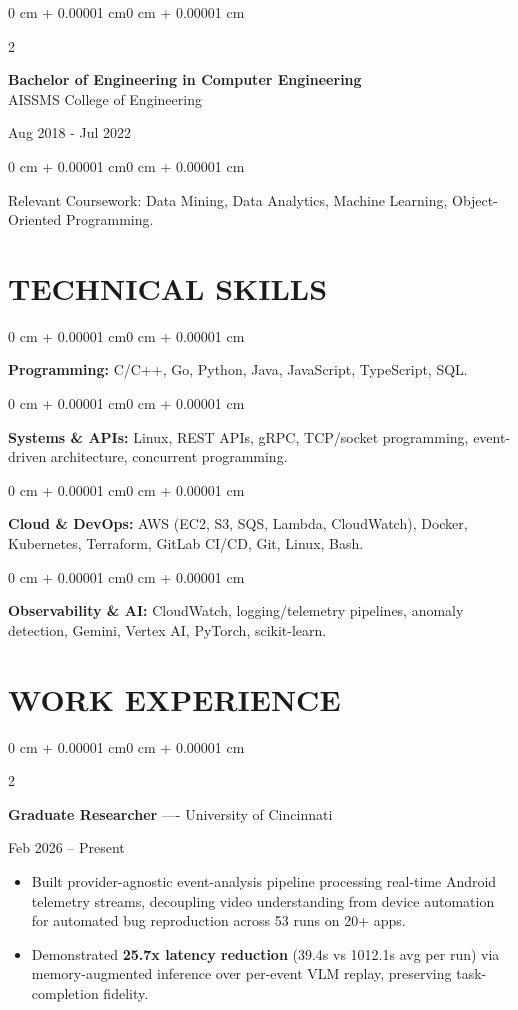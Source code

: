 \documentclass[10pt, letterpaper]{article}
\newenvironment{highlights}{
    \begin{itemize}[
        topsep=0.10 cm,
        parsep=0.06 cm,
        partopsep=0pt,
        itemsep=0.06 cm,
        leftmargin=12pt
    ]
}{
    \end{itemize}
}
\newenvironment{onecolentry}{
    \begin{adjustwidth}{0 cm + 0.00001 cm}{0 cm + 0.00001 cm}
}{
    \end{adjustwidth}
}
\newenvironment{twocolentry}[2][]{
    \onecolentry
    \def\secondColumn{#2}
    \setcolumnwidth{\fill, 4.5 cm}
    \begin{paracol}{2}
}{
    \switchcolumn \raggedleft \secondColumn
    \end{paracol}
    \endonecolentry
}
\begin{document}
\begin{twocolentry}{
    Aug 2018 - Jul 2022
}
    \textbf{Bachelor of Engineering in Computer Engineering} \\
    AISSMS College of Engineering
\end{twocolentry}
\begin{onecolentry}
Relevant Coursework: Data Mining, Data Analytics, Machine Learning, Object-Oriented Programming.
\end{onecolentry}
\section{TECHNICAL SKILLS}
\begin{onecolentry}
\textbf{Programming:} C/C++, Go, Python, Java, JavaScript, TypeScript, SQL.
\end{onecolentry}
\vspace{0.06 cm}
\begin{onecolentry}
\textbf{Systems \& APIs:} Linux, REST APIs, gRPC, TCP/socket programming, event-driven architecture, concurrent programming.
\end{onecolentry}
\vspace{0.06 cm}
\begin{onecolentry}
\textbf{Cloud \& DevOps:} AWS (EC2, S3, SQS, Lambda, CloudWatch), Docker, Kubernetes, Terraform, GitLab CI/CD, Git, Linux, Bash.
\end{onecolentry}
\vspace{0.06 cm}
\begin{onecolentry}
\textbf{Observability \& AI:} CloudWatch, logging/telemetry pipelines, anomaly detection, Gemini, Vertex AI, PyTorch, scikit-learn.
\end{onecolentry}

\section{WORK EXPERIENCE}
\begin{twocolentry}{Feb 2026 -- Present}
\textbf{Graduate Researcher} ---- University of Cincinnati
\end{twocolentry}
\begin{highlights}
  \item Built provider-agnostic event-analysis pipeline processing real-time Android telemetry streams, decoupling video understanding from device automation for automated bug reproduction across 53 runs on 20+ apps.
  \item Demonstrated \textbf{25.7x latency reduction} (39.4s vs 1012.1s avg per run) via memory-augmented inference over per-event VLM replay, preserving task-completion fidelity.
\end{highlights}
\end{document}
